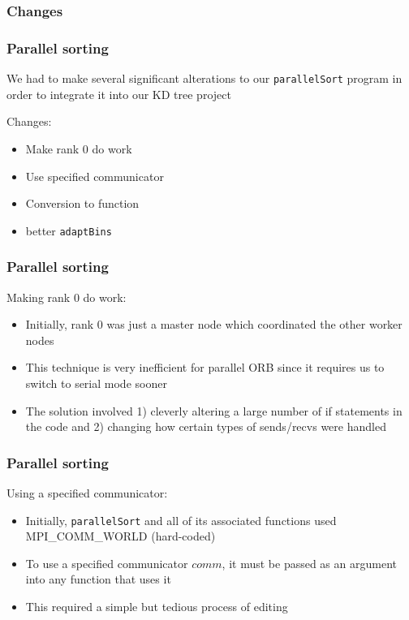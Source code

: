 \documentclass[usernames,dvipsnames]{beamer}
\begin{document}
\subsubsection{Changes}

\begin{frame}
	\frametitle{Parallel sorting}
	
	We had to make several significant alterations to our \texttt{parallelSort} program in order to integrate it into our KD tree project
	
	\vspace{10pt}
	
	\begin{block}{Changes:}
		\begin{itemize}
			\item Make rank 0 do work
			\item Use specified communicator
			\item Conversion to function
			\item better \texttt{adaptBins}
		\end{itemize}
	\end{block}
\end{frame}

\begin{frame}
	\frametitle{Parallel sorting}
	
	\begin{block}{Making rank 0 do work:}
		\begin{itemize}
			\item Initially, rank 0 was just a master node which coordinated the other worker nodes
			\item This technique is very inefficient for parallel ORB since it requires us to switch to serial mode sooner
			\item The solution involved 1) cleverly altering a large number of if statements in the code and 2) changing how certain types of sends/recvs were handled
		\end{itemize}
	\end{block}
\end{frame}

\begin{frame}
	\frametitle{Parallel sorting}
	
	\begin{block}{Using a specified communicator:}
		\begin{itemize}
			\item Initially, \texttt{parallelSort} and all of its associated functions used MPI\_COMM\_WORLD (hard-coded)
			\item To use a specified communicator $comm$, it must be passed as an argument into any function that uses it
			\item This required a simple but tedious process of editing
		\end{itemize}
	\end{block}
\end{frame}
\end{document}
